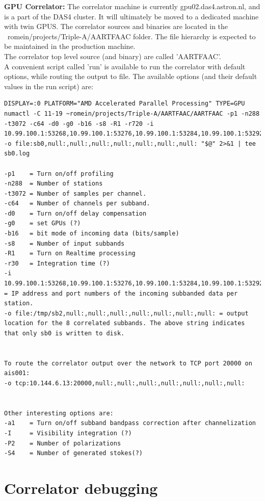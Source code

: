 \documentclass {article}
\begin{document}
\textbf {GPU Correlator:} The correlator machine is currently gpu02.das4.astron.nl,
and is a part  of the DAS4 cluster.  It will ultimately  be moved to a dedicated
machine with twin  GPUS. The correlator sources and binaries  are located in the
~romein/projects/Triple-A/AARTFAAC folder.  The file hierarchy is expected to be
maintained in  the production  machine.\\ The correlator  top level  source (and
binary) are called  'AARTFAAC'.\\ A convenient script called  'run' is available
to  run  the  correlator with  default  options,  while  routing the  output  to
file. The  available options (and  their default values in the run script) are:
\begin{verbatim}
DISPLAY=:0 PLATFORM="AMD Accelerated Parallel Processing" TYPE=GPU numactl -C 11-19 ~romein/projects/Triple-A/AARTFAAC/AARTFAAC -p1 -n288 -t3072 -c64 -d0 -g0 -b16 -s8 -R1 -r720 -i 10.99.100.1:53268,10.99.100.1:53276,10.99.100.1:53284,10.99.100.1:53292,10.99.100.1:53300,10.99.100.1:53308 -o file:sb0,null:,null:,null:,null:,null:,null:,null: "$@" 2>&1 | tee sb0.log

-p1    = Turn on/off profiling
-n288  = Number of stations
-t3072 = Number of samples per channel.
-c64   = Number of channels per subband.
-d0    = Turn on/off delay compensation
-g0    = set GPUs (?)
-b16   = bit mode of incoming data (bits/sample)
-s8    = Number of input subbands
-R1    = Turn on Realtime processing
-r30   = Integration time (?)
-i
10.99.100.1:53268,10.99.100.1:53276,10.99.100.1:53284,10.99.100.1:53292,10.99.100.1:53300,10.99.100.1:53308
= IP address and port numbers of the incoming subbanded data per station.
-o file:/tmp/sb2,null:,null:,null:,null:,null:,null:,null: = output location for the 8 correlated subbands. The above string indicates that only sb0 is written to disk. 


To route the correlator output over the network to TCP port 20000 on ais001:
-o tcp:10.144.6.13:20000,null:,null:,null:,null:,null:,null:,null:


Other interesting options are:
-a1    = Turn on/off subband bandpass correction after channelization
-I     = Visibility integration (?)
-P2    = Number of polarizations
-S4    = Number of generated stokes(?)
\end{verbatim}

\section {Correlator debugging}
\end{document}
